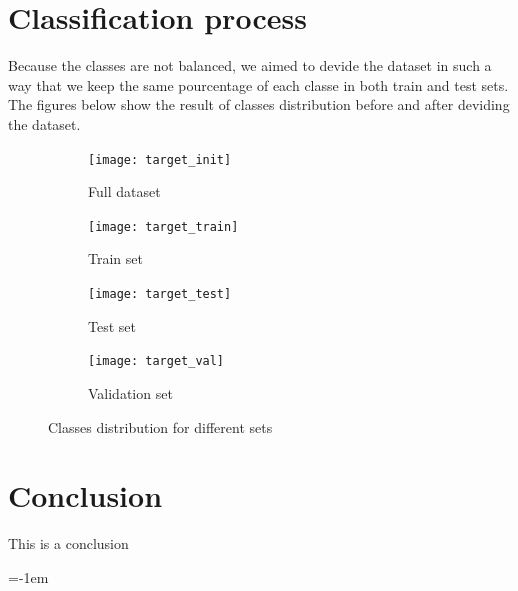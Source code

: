 \documentclass[a4paper,english,12pt]{article}
\makeatletter
\newcommand{\emptypage}[1]{
  \cleardoublepage
  \begingroup
  \let\ps@plain\ps@empty
  \pagestyle{empty}
  #1
  \cleardoublepage
  \endgroup}
\makeatother
\begin{document}
\section{Classification process}

Because the classes are not balanced, we aimed to devide the dataset in such a way that we keep the same pourcentage of each classe in both train and test sets. The figures below show the result of classes distribution before and after deviding the dataset.

\begin{figure}[H]
	\centering
	\begin{subfigure}{0.22\textwidth}
		\texttt{[image: target\_init]}
		\caption{Full dataset}
	\end{subfigure}
	\begin{subfigure}{0.22\textwidth}
		\texttt{[image: target\_train]}
		\caption{Train set}
	\end{subfigure}
	\begin{subfigure}{0.22\textwidth}
		\texttt{[image: target\_test]}
		\caption{Test set}
	\end{subfigure}
	\begin{subfigure}{0.22\textwidth}
		\texttt{[image: target\_val]}
		\caption{Validation set}
	\end{subfigure}
	\caption{Classes distribution for different sets}
\end{figure}

\section{Conclusion}
This is a conclusion


\parskip=-1em
\let\section\oldsection %
%
\end{document}

